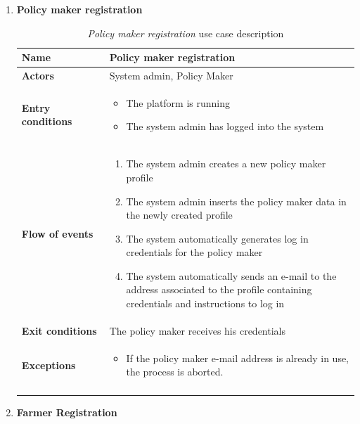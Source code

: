 \documentclass[10pt]{article}
\begin{document}
\begin{enumerate}[label=\textbf{UC\arabic*}]
    \item \label{uc:uc1} \textbf{Policy maker registration}
        \begin{longtable}{p{0.26\linewidth}p{0.75\linewidth}}
            \toprule
            \textbf{Name} & \textbf{Policy maker registration} \\
            \midrule
            \textbf{Actors} & System admin, Policy Maker\\
            \midrule
            \textbf{Entry conditions} &
            \begin{itemize}
                \item The platform is running
                \item The system admin has logged into the system
            \end{itemize}\\
            \midrule
            \textbf{Flow of events} & 
            \begin{enumerate}
                \item The system admin creates a new policy maker profile
                \item The system admin inserts the policy maker data in the newly created profile
                \item The system automatically generates log in credentials for the policy maker
                \item The system automatically sends an e-mail to the address associated to the profile containing credentials and instructions to log in
            \end{enumerate} \\
            \midrule
            \textbf{Exit conditions} & The policy maker receives his credentials\\
            \midrule
            \textbf{Exceptions} & 
            \begin{itemize}
                \item If the policy maker e-mail address is already in use, the process is aborted.
            \end{itemize} \\
            \bottomrule
            \caption{\emph{Policy maker registration} use case description}
        \end{longtable}
    \newpage
    \item \label{uc:uc2} \textbf{Farmer Registration} 
        \begin{longtable}{p{0.26\linewidth}p{0.75\linewidth}}

\end{longtable}
\end{enumerate}
\end{document}
